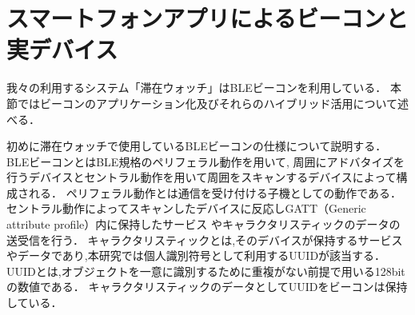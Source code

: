 \section{スマートフォンアプリによるビーコンと実デバイス}\label{4.3}
我々の利用するシステム「滞在ウォッチ」はBLEビーコンを利用している．
本節ではビーコンのアプリケーション化及びそれらのハイブリッド活用について述べる．

初めに滞在ウォッチで使用しているBLEビーコンの仕様について説明する．
BLEビーコンとはBLE規格のペリフェラル動作を用いて,
周囲にアドバタイズを行うデバイスとセントラル動作を用いて周囲をスキャンするデバイスによって構成される．
ペリフェラル動作とは通信を受け付ける子機としての動作である．
セントラル動作によってスキャンしたデバイスに反応しGATT（Generic attribute profile）内に保持したサービス
やキャラクタリスティックのデータの送受信を行う．
キャラクタリスティックとは,そのデバイスが保持するサービスやデータであり,本研究では個人識別符号として利用するUUIDが該当する．
UUIDとは,オブジェクトを一意に識別するために重複がない前提で用いる128bitの数値である．
キャラクタリスティックのデータとしてUUIDをビーコンは保持している．










